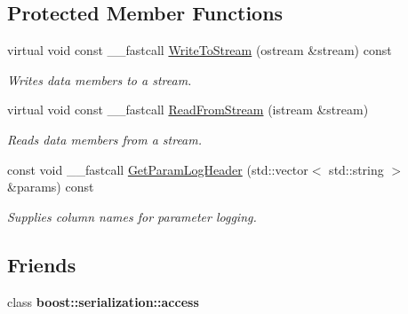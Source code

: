 \subsection*{Protected Member Functions}
\begin{DoxyCompactItemize}
\item 
\hypertarget{class_t_gap_junction_current_a0a2cf2b5493b5552a7d9ce831f4a9e7d}{virtual void const \+\_\+\+\_\+fastcall \hyperlink{class_t_gap_junction_current_a0a2cf2b5493b5552a7d9ce831f4a9e7d}{Write\+To\+Stream} (ostream \&stream) const }\label{class_t_gap_junction_current_a0a2cf2b5493b5552a7d9ce831f4a9e7d}

\begin{DoxyCompactList}\small\item\em Writes data members to a stream. \end{DoxyCompactList}\item 
\hypertarget{class_t_gap_junction_current_aabaa3a51eb6a2bb6481283d18150971d}{virtual void const \+\_\+\+\_\+fastcall \hyperlink{class_t_gap_junction_current_aabaa3a51eb6a2bb6481283d18150971d}{Read\+From\+Stream} (istream \&stream)}\label{class_t_gap_junction_current_aabaa3a51eb6a2bb6481283d18150971d}

\begin{DoxyCompactList}\small\item\em Reads data members from a stream. \end{DoxyCompactList}\item 
const void \+\_\+\+\_\+fastcall \hyperlink{class_t_gap_junction_current_a6cf61f4dad13d5c48004d058d70675cb}{Get\+Param\+Log\+Header} (std\+::vector$<$ std\+::string $>$ \&params) const 
\begin{DoxyCompactList}\small\item\em Supplies column names for parameter logging. \end{DoxyCompactList}\end{DoxyCompactItemize}
\subsection*{Friends}
\begin{DoxyCompactItemize}
\item 
\hypertarget{class_t_gap_junction_current_ac98d07dd8f7b70e16ccb9a01abf56b9c}{class {\bfseries boost\+::serialization\+::access}}\label{class_t_gap_junction_current_ac98d07dd8f7b70e16ccb9a01abf56b9c}

\end{DoxyCompactItemize}


